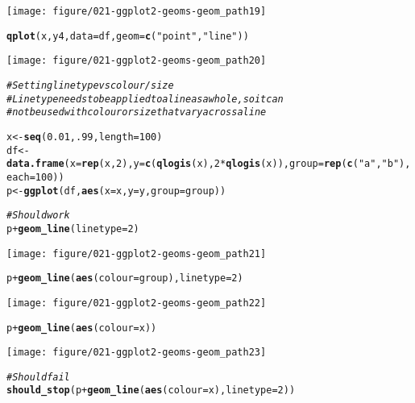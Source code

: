 \documentclass[a4paper,titlepage]{tufte-handout}\usepackage[]{graphicx}\usepackage[]{color}
\makeatletter
\def\maxwidth{ %
  \ifdim\Gin@nat@width>\linewidth
    \linewidth
  \else
    \Gin@nat@width
  \fi
}
\newcommand{\hlnum}[1]{\textcolor[rgb]{0.686,0.059,0.569}{#1}}%
\newcommand{\hlstr}[1]{\textcolor[rgb]{0.192,0.494,0.8}{#1}}%
\newcommand{\hlcom}[1]{\textcolor[rgb]{0.678,0.584,0.686}{\textit{#1}}}%
\newcommand{\hlopt}[1]{\textcolor[rgb]{0,0,0}{#1}}%
\newcommand{\hlstd}[1]{\textcolor[rgb]{0.345,0.345,0.345}{#1}}%
\newcommand{\hlkwb}[1]{\textcolor[rgb]{0.69,0.353,0.396}{#1}}%
\newcommand{\hlkwc}[1]{\textcolor[rgb]{0.333,0.667,0.333}{#1}}%
\newcommand{\hlkwd}[1]{\textcolor[rgb]{0.737,0.353,0.396}{\textbf{#1}}}%
\newenvironment{kframe}{%
 \def\at@end@of@kframe{}%
 \ifinner\ifhmode%
  \def\at@end@of@kframe{\end{minipage}}%
  \begin{minipage}{\columnwidth}%
 \fi\fi%
 \def\FrameCommand##1{\hskip\@totalleftmargin \hskip-\fboxsep
 \colorbox{shadecolor}{##1}\hskip-\fboxsep
     \hskip-\linewidth \hskip-\@totalleftmargin \hskip\columnwidth}%
 \MakeFramed {\advance\hsize-\width
   \@totalleftmargin\z@ \linewidth\hsize
   \@setminipage}}%
 {\par\unskip\endMakeFramed%
 \at@end@of@kframe}
\newenvironment{knitrout}{}{} %
\makeatother
\begin{document}
\begin{knitrout}
\begin{kframe}
{\ttfamily\noindent\color{warningcolor}{\#\# Warning: Removed 1 rows containing missing values (geom\_point).}}\end{kframe}
\texttt{[image: figure/021-ggplot2-geoms-geom\_path19]} 
\begin{kframe}\begin{alltt}
\hlkwd{qplot}\hlstd{(x, y4,} \hlkwc{data} \hlstd{= df,} \hlkwc{geom} \hlstd{=} \hlkwd{c}\hlstd{(}\hlstr{"point"}\hlstd{,}\hlstr{"line"}\hlstd{))}
\end{alltt}
\end{kframe}
\texttt{[image: figure/021-ggplot2-geoms-geom\_path20]} 
\begin{kframe}\begin{alltt}
\hlcom{# Setting line type vs colour/size}
\hlcom{# Line type needs to be applied to a line as a whole, so it can}
\hlcom{# not be used with colour or size that vary across a line}

\hlstd{x} \hlkwb{<-} \hlkwd{seq}\hlstd{(}\hlnum{0.01}\hlstd{,} \hlnum{.99}\hlstd{,} \hlkwc{length}\hlstd{=}\hlnum{100}\hlstd{)}
\hlstd{df} \hlkwb{<-} \hlkwd{data.frame}\hlstd{(}\hlkwc{x} \hlstd{=} \hlkwd{rep}\hlstd{(x,} \hlnum{2}\hlstd{),} \hlkwc{y} \hlstd{=} \hlkwd{c}\hlstd{(}\hlkwd{qlogis}\hlstd{(x),} \hlnum{2} \hlopt{*} \hlkwd{qlogis}\hlstd{(x)),} \hlkwc{group} \hlstd{=} \hlkwd{rep}\hlstd{(}\hlkwd{c}\hlstd{(}\hlstr{"a"}\hlstd{,}\hlstr{"b"}\hlstd{),} \hlkwc{each}\hlstd{=}\hlnum{100}\hlstd{))}
\hlstd{p} \hlkwb{<-} \hlkwd{ggplot}\hlstd{(df,} \hlkwd{aes}\hlstd{(}\hlkwc{x}\hlstd{=x,} \hlkwc{y}\hlstd{=y,} \hlkwc{group}\hlstd{=group))}

\hlcom{# Should work}
\hlstd{p} \hlopt{+} \hlkwd{geom_line}\hlstd{(}\hlkwc{linetype} \hlstd{=} \hlnum{2}\hlstd{)}
\end{alltt}
\end{kframe}
\texttt{[image: figure/021-ggplot2-geoms-geom\_path21]} 
\begin{kframe}\begin{alltt}
\hlstd{p} \hlopt{+} \hlkwd{geom_line}\hlstd{(}\hlkwd{aes}\hlstd{(}\hlkwc{colour} \hlstd{= group),} \hlkwc{linetype} \hlstd{=} \hlnum{2}\hlstd{)}
\end{alltt}
\end{kframe}
\texttt{[image: figure/021-ggplot2-geoms-geom\_path22]} 
\begin{kframe}\begin{alltt}
\hlstd{p} \hlopt{+} \hlkwd{geom_line}\hlstd{(}\hlkwd{aes}\hlstd{(}\hlkwc{colour} \hlstd{= x))}
\end{alltt}
\end{kframe}
\texttt{[image: figure/021-ggplot2-geoms-geom\_path23]} 
\begin{kframe}\begin{alltt}
\hlcom{# Should fail}
\hlkwd{should_stop}\hlstd{(p} \hlopt{+} \hlkwd{geom_line}\hlstd{(}\hlkwd{aes}\hlstd{(}\hlkwc{colour} \hlstd{= x),} \hlkwc{linetype}\hlstd{=}\hlnum{2}\hlstd{))}


\end{alltt}
\end{kframe}
\end{knitrout}
\end{document}

